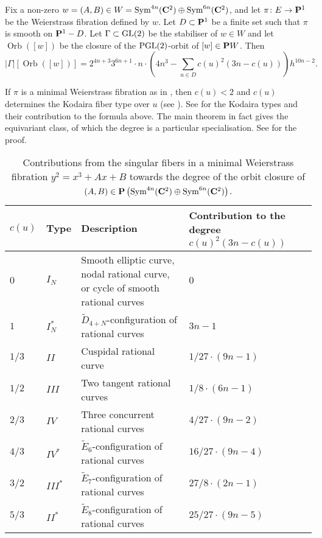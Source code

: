 \documentclass{amsart}
\DeclareMathOperator{\Orb}{Orb}
\begin{document}
\begin{theorem}\label{thm:ellipticfibrations}
  Fix a non-zero \(w = (A,B) \in  W = \Sym^{4n}(\C^2) \oplus \Sym^{6n}(\C^2)\), and let \(\pi \colon E \to \P^1\) be the Weierstrass fibration defined by \(w\).
  Let \(D \subset \P^1\) be a finite set such that \(\pi\) is smooth on \(\P^{1} - D\).
  Let \(\Gamma \subset \GL(2)\) be the stabiliser of \(w \in W\) and let \(\Orb([w])\) be the closure of the \(\PGL(2)\)-orbit of \([w] \in \P W\).
  Then
  \[ |\Gamma| [\Orb([w])] = 2^{4n+3}3^{6n+1}\cdot n \cdot \left(4n^3-\sum_{u \in D}c(u)^2(3n-c(u)) \right) h^{10n-2}.\]
\end{theorem}
If \(\pi\) is a minimal Weierstrass fibration as in \cite[III.3]{mir:89}, then \(c(u) < 2\) and \(c(u)\) determines the Kodaira fiber type over \(u\) (see \cite[IV.3.1]{mir:89}).
See  for the Kodaira types and their contribution to the formula above.
The main theorem in fact gives the equivariant class, of which the degree is a particular specialisation.
See  for the proof.
\begin{table}[h]
  \centering
  \begin{tabular}[h3]{llp{}p{}}
    \toprule
\(c(u)\) &    Type & Description  & Contribution to the degree \(c(u)^2(3n-c(u))\)\\
    \midrule
\(0\)&    \(I_N\) &Smooth elliptic curve, nodal rational curve, or cycle of smooth rational curves& \(0\) \\
\(1\) &    \(I_N^{*}\)& \(\widetilde D_{4+N}\)-configuration of rational curves &\(3n-1\) \\
\(1/3\) &    \(II\) &Cuspidal rational curve & \({1}/{27} \cdot (9n-1)\)\\
\(1/2\) &    \(III\)&Two tangent rational curves&\({1}/{8} \cdot (6n-1)\) \\
\(2/3\) &    \(IV\)&Three concurrent rational curves &\({4}/{27} \cdot (9n-2)\) \\
\(4/3\)&    \(IV^{*}\)&\(\widetilde E_{6}\)-configuration of rational curves & \({16}/{27} \cdot (9n-4)\)\\
\(3/2\)&    \(III^{*}\)&\(\widetilde E_{7}\)-configuration of rational curves &\({27}/{8} \cdot (2n-1)\) \\
\(5/3\)&    \(II^{*}\)&\(\widetilde E_{8}\)-configuration of rational curves &\({25}/{27} \cdot (9n-5)\)\\
    \bottomrule
  \end{tabular}
    \caption[Contributions of singular fibers]{Contributions from the singular fibers in a minimal Weierstrass fibration \(y^2 = x^3 + Ax +B\) towards the degree of the orbit closure of \((A,B) \in \P\left(\Sym^{4n}(\C^{2}) \oplus \Sym^{6n}(\C^{2})\right)\). }
  \label{tab:ellipticfibers}
\end{table}
\end{document}

